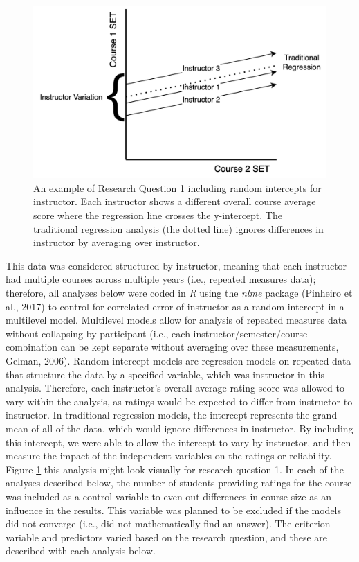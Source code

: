 \documentclass[
  man]{apa7}
\begin{document}
\begin{figure}
\includegraphics[width=4.67in]{includes/random_intercept} \caption{An example of Research Question 1 including random intercepts for instructor. Each instructor shows a different overall course average score where the regression line crosses the y-intercept. The traditional regression analysis (the dotted line) ignores differences in instructor by averaging over instructor.}\label{fig:figure-random-explain}
\end{figure}

This data was considered structured by instructor, meaning that each
instructor had multiple courses across multiple years (i.e., repeated
measures data); therefore, all analyses below were coded in \emph{R} using
the \emph{nlme} package (Pinheiro et al., 2017) to control for correlated error of
instructor as a random intercept in a multilevel model. Multilevel
models allow for analysis of repeated measures data without collapsing
by participant (i.e., each instructor/semester/course combination can be
kept separate without averaging over these measurements, Gelman, 2006).
Random intercept models are regression models on repeated data that
structure the data by a specified variable, which was instructor in this
analysis. Therefore, each instructor's overall average rating score was
allowed to vary within the analysis, as ratings would be expected to differ from instructor to instructor. In traditional regression
models, the intercept represents the grand mean of all of the data,
which would ignore differences in instructor. By including this
intercept, we were able to allow the intercept to vary by instructor,
and then measure the impact of the independent variables on the ratings
or reliability. Figure \ref{fig:figure-random-explain} this analysis might look visually for research question 1. In each of
the analyses described below, the number of students providing ratings
for the course was included as a control variable to even out
differences in course size as an influence in the results. This variable
was planned to be excluded if the models did not converge (i.e., did not
mathematically find an answer). The criterion variable and predictors
varied based on the research question, and these are described with each
analysis below.
\end{document}
